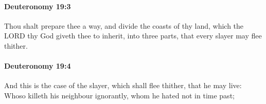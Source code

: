 		\paragraph{Deuteronomy 19:3} %
			\label{DEUTERONOMY-19-3}

			Thou shalt prepare thee a way, and divide the coasts of thy land, which the LORD thy God giveth thee to inherit, into three parts, that every slayer may flee thither.


		\paragraph{Deuteronomy 19:4} %
			\label{DEUTERONOMY-19-4}

			And this is the case of the slayer, which shall flee thither, that he may live: Whoso killeth his neighbour ignorantly, whom he hated not in time past;


